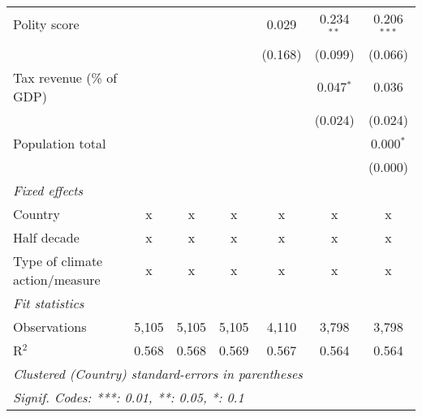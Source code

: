 \begin{tabular}{lcccccc}
   Polity score                                             &              &               &                & 0.029          & 0.234$^{**}$   & 0.206$^{***}$\\   
                                                            &              &               &                & (0.168)        & (0.099)        & (0.066)\\   
   Tax revenue (\% of GDP)                                  &              &               &                &                & 0.047$^{*}$    & 0.036\\   
                                                            &              &               &                &                & (0.024)        & (0.024)\\   
   Population total                                         &              &               &                &                &                & 0.000$^{*}$\\   
                                                            &              &               &                &                &                & (0.000)\\   
   \emph{Fixed effects}\\
   Country                                                  & x            & x             & x              & x              & x              & x\\  
   Half decade                                              & x            & x             & x              & x              & x              & x\\  
   Type of climate action/measure                           & x            & x             & x              & x              & x              & x\\  
   \midrule \emph{Fit statistics}\\
   Observations                                             & 5,105        & 5,105         & 5,105          & 4,110          & 3,798          & 3,798\\  
   R$^2$                                                    & 0.568        & 0.568         & 0.569          & 0.567          & 0.564          & 0.564\\  
   \midrule
   \multicolumn{7}{l}{\emph{Clustered (Country) standard-errors in parentheses}}\\
   \multicolumn{7}{l}{\emph{Signif. Codes: ***: 0.01, **: 0.05, *: 0.1}}\\
\end{tabular}
\par\endgroup


